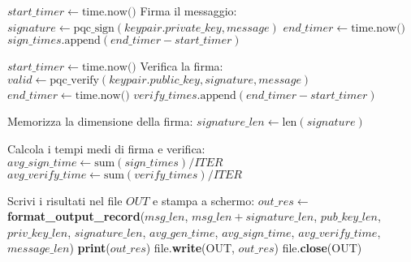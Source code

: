 \begin{breakablealgorithm}
\begin{algorithmic}[1]
        \State $start\_timer \gets \text{time.now()}$
        \State Firma il messaggio: 
        \State $signature \gets \text{pqc\_sign}(keypair.private\_key, message)$
        \State $end\_timer \gets \text{time.now()}$
        \State $sign\_times.\text{append}(end\_timer - start\_timer)$

        \State $start\_timer \gets \text{time.now()}$
        \State Verifica la firma: 
        \State $valid \gets \text{pqc\_verify}(keypair.public\_key, signature, message)$
        \State $end\_timer \gets \text{time.now()}$
        \State $verify\_times.\text{append}(end\_timer - start\_timer)$
    \EndFor
    
    \State Memorizza la dimensione della firma: 
    \State $signature\_len \gets \text{len}(signature)$

    \State Calcola i tempi medi di firma e verifica:
    \State $avg\_sign\_time \gets \text{sum}(sign\_times) / ITER$
    \State $avg\_verify\_time \gets \text{sum}(verify\_times) / ITER$

    \State Scrivi i risultati nel file $OUT$ e stampa a schermo:
    \State $out\_res \gets$ \textbf{format\_output\_record}($msg\_len$, $msg\_len + signature\_len$, $pub\_key\_len$, $priv\_key\_len$, $signature\_len$, $avg\_gen\_time$, $avg\_sign\_time$, $avg\_verify\_time$, $message\_len$)
    \State \textbf{print}($out\_res$) 
    \State file.\textbf{write}(OUT, $out\_res$)
\EndFor
\State file.\textbf{close}(OUT)
\end{algorithmic}
\label{alg:performancetest}
\end{breakablealgorithm}

